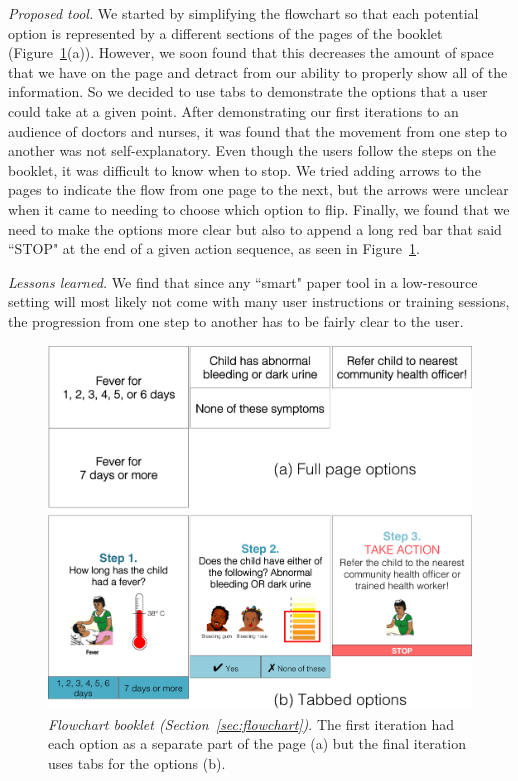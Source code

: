 \documentclass{sig-alternate}
\begin{document}
\emph{Proposed tool.}
We started by simplifying the flowchart so that each potential option is represented by a different sections of the pages of the booklet (Figure~\ref{fig:flowchart}(a)). However, we soon found that this decreases the amount of space that we have on the page and detract from our ability to properly show all of the information. So we decided to use tabs to demonstrate the options that a user could take at a given point. After demonstrating our first iterations to an audience of doctors and nurses, it was found that the movement from one step to another was not self-explanatory. Even though the users follow the steps on the booklet, it was difficult to know when to stop. We tried adding arrows to the pages to indicate the flow from one page to the next, but the arrows were unclear when it came to needing to choose which option to flip. Finally, we found that we need to make the options more clear but also to append a long red bar that said ``STOP" at the end of a given action sequence, as seen in Figure~\ref{fig:flowchart}.

\emph{Lessons learned.}
We find that since any ``smart" paper tool in a low-resource setting will most likely not come with many user instructions or training sessions, the progression from one step to another has to be fairly clear to the user.

\begin{figure}
\centering
\includegraphics[width=\linewidth]{img/flowchart.png}
\caption{\emph{Flowchart booklet (Section~\ref{sec:flowchart})}. The first iteration had each option as a separate part of the page (a) but the final iteration uses tabs for the options (b).}
\label{fig:flowchart}
\end{figure}
\end{document}
